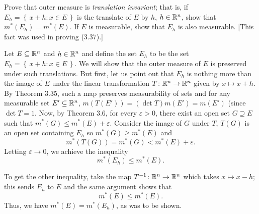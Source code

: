 \begin{problem}
  Prove that outer measure is \emph{translation invariant}; that is, if
  \(E_h=\left\{\,x+h:x\in E\,\right\}\) is the translate of \(E\) by \(h\),
  \(h\in\mathbb{R}^n\), show that \(m^*(E_h)=m^*(E)\). If \(E\) is measurable,
  show that \(E_h\) is also measurable. [This fact was used in proving
  (3.37).]
\end{problem}
\begin{solution}
  Let \(E\subseteq\mathbb{R}^n\) and \(h\in\mathbb{R}^n\) and define the set \(E_h\) to
  be the set \(E_h=\left\{\,x+h:x\in E\,\right\}\). We will show that the
  outer measure of \(E\) is preserved under such translations. But first,
  let us point out that \(E_h\) is nothing more than the image of \(E\)
  under the linear transformation \(T\colon\mathbb{R}^n\to\mathbb{R}^n\) given by
  \(x\mapsto x+h\). By Theorem 3.35, such a map preserves measurability of
  sets and for any measurable set \(E'\subseteq\mathbb{R}^n\),
  \(m(T(E'))=(\det T)m(E')=m(E')\) (since \(\det T=1\). Now, by Theorem
  3.6, for every \(\varepsilon>0\), there exist an open set
  \(G\supseteq E\) such that \(m^*(G)\leq m^*(E)+\varepsilon\). Consider
  the image of \(G\) under \(T\), \(T(G)\) is an open set containing
  \(E_h\) so \(m^*(G)\geq m^*(E)\) and
  \[
    m^*(T(G))=m^*(G)<m^*(E)+\varepsilon.
  \]
  Letting \(\varepsilon\to 0\), we achieve the inequality
  \[
    m^*(E_h)\leq m^*(E).
  \]

  To get the other inequality, take the map \(T^{-1}\colon\mathbb{R}^n\to\mathbb{R}^n\)
  which takes \(x\mapsto x-h\); this sends \(E_h\) to \(E\) and the same
  argument shows that
  \[
    m^*(E)\leq m^*(E).
  \]
  Thus, we have \(m^*(E)=m^*(E_h)\), as was to be shown.
\end{solution}

